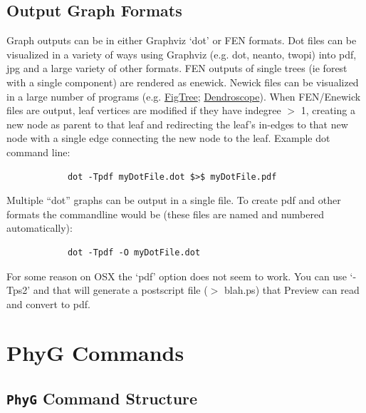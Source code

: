 \documentclass[11pt]{book}
\newcommand{\phyg}{\texttt{PhyG} }
\begin{document}
{{	\section{Output Graph Formats}
	Graph outputs can be in either Graphviz `dot' or FEN formats. Dot files can be visualized in a variety of ways 
	using Graphviz (e.g. dot, neanto, twopi) into pdf, jpg and a large variety of other formats. FEN outputs of 
	single trees (ie forest with a single component) are rendered as enewick. Newick files can be visualized in a 
	large number of programs (e.g. \href{http://tree.bio.ed.ac.uk/software/figtree/}{FigTree}; 
	\href{http:/https://uni-tuebingen.de/fakultaeten/mathematisch-naturwissenschaftliche-fakultaet/fachbereiche/informatik/lehrstuehle/algorithms-in-bioinformatics/software/}
	{Dendroscope}). 	
	When FEN/Enewick files are output, leaf vertices are modified if they have indegree $>$ 1, creating a new node as parent to that leaf
	and redirecting the leaf's in-edges to that new node with a single edge connecting the new node to the leaf. Example dot command line: 
	
		\begin{verbatim}
			dot -Tpdf myDotFile.dot $>$ myDotFile.pdf
		\end{verbatim}
		
	Multiple ``dot'' graphs can be output in a single file. To create pdf and other formats the
	commandline would be (these files are named and numbered automatically):
	
		\begin{verbatim}
			dot -Tpdf -O myDotFile.dot
		\end{verbatim}
		
	For some reason on OSX the `pdf' option does not seem to work. You can use `-Tps2' and that will generate 
	a postscript file ($>$ blah.ps) that Preview can read and convert to pdf.

	

	
\chapter{PhyG Commands}

\section{\phyg Command Structure}
		
}}
\end{document}
